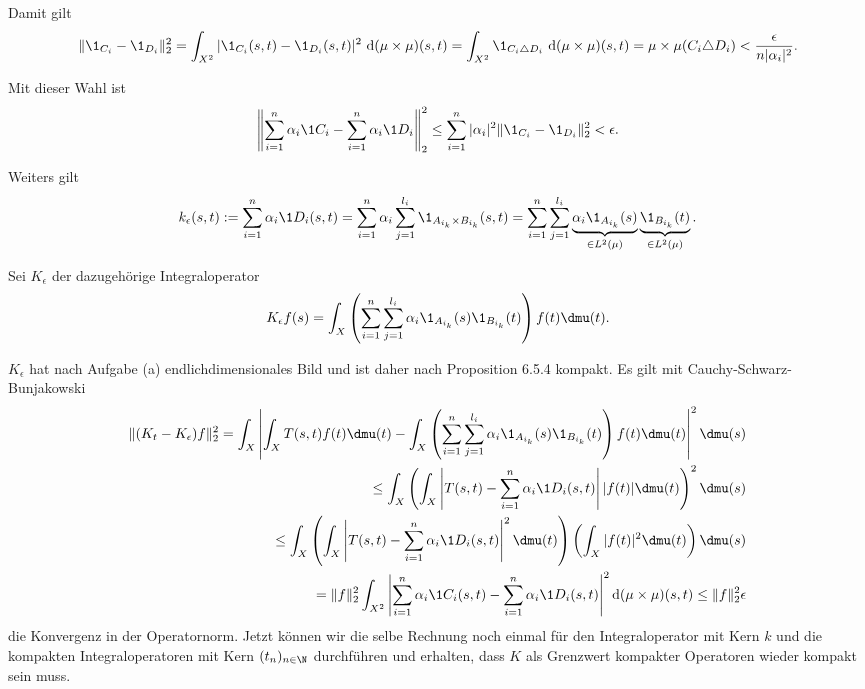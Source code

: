 \begin{solution}
\begin{enumerate}[label = (\alph*)]
Damit gilt
\begin{align*}
    \|\1_{C_i} - \1_{D_i}\|_2^2 = \int_{X^2} |\1_{C_i}(s,t) - \1_{D_i}(s,t)|^2
     ~\mathrm{d}(\mu\times\mu)(s,t) = \int_{X^2} \1_{C_i \triangle D_i}~\mathrm{d}(\mu\times\mu)(s,t) =
     \mu\times\mu(C_i \triangle D_i) < \/
     \frac{\epsilon}{n|\alpha_i|^2}.
\end{align*}


Mit dieser Wahl ist
\begin{align*}
    \left\| \sum_{i = 1}^n \alpha_i \1C_i -
    \sum_{i = 1}^n \alpha_i \1D_i\right\|_2^2
    \leq \sum_{i=1}^{n} |\alpha_{i}|^2 \|\1_{C_{i}} - \1_{D_{i}} \|_2^2 < \epsilon.
\end{align*}

Weiters gilt
\begin{align*}
    k_{\epsilon}(s,t) := \sum_{i = 1}^n \alpha_i \1D_i(s,t)
    = \sum_{i=1}^{n} \alpha_{i} \sum_{j=1}^{l_{i}}  \1_{A_{i_k} \times B_{i_k}}(s,t)
    = \sum_{i=1}^{n} \sum_{j=1}^{l_{i}}   \underbrace{\alpha_{i} \1_{A_{i_k}}(s)}_{\in L^2(\mu)}
     \underbrace{\1_{B_{i_k}}(t)}_{\in L^2(\mu)}.
\end{align*}

Sei $K_{\epsilon}$ der dazugehörige Integraloperator
\begin{align*}
  K_{\epsilon} f(s) = \int_X \left(\sum_{i=1}^{n} \sum_{j=1}^{l_{i}}   \alpha_{i} \1_{A_{i_k}}(s) \1_{B_{i_k}}(t)\right) f(t) \dmu(t).
\end{align*}

$K_{\epsilon}$ hat nach Aufgabe (a) endlichdimensionales Bild und ist daher nach Proposition 6.5.4 kompakt. Es gilt mit Cauchy-Schwarz-Bunjakowski
\begin{align*}
    \|(K_t-K_{\epsilon}) f\|_2^2 = \int_X \left| \int_X T(s,t) f(t) \dmu(t) - \int_X \left(\sum_{i=1}^{n} \sum_{j=1}^{l_{i}}   \alpha_{i} \1_{A_{i_k}}(s) \1_{B_{i_k}}(t)\right) f(t) \dmu(t) \right|^2 \dmu(s) \\
    \leq \int_X \left( \int_X \left|T(s,t) - \sum_{i = 1}^n \alpha_i \1D_i(s,t)\right| |f(t)| \dmu(t)\right)^2 \dmu(s) \\
    \leq \int_X \left(\int_X \left|T(s,t) - \sum_{i = 1}^n \alpha_i \1D_i(s,t)\right|^2 \dmu(t)\right) \left(\int_X |f(t)|^2 \dmu(t)\right) \dmu(s) \\
    = \|f\|_2^2\int_{X^2} \left| \sum_{i = 1}^n \alpha_i \1C_i(s,t) -
    \sum_{i = 1}^n \alpha_i \1D_i(s,t)\right|^2 \mathrm{d}(\mu\times\mu)(s,t) \leq \|f\|_2^2\epsilon
\end{align*}
die Konvergenz in der Operatornorm.
Jetzt können wir die selbe Rechnung noch einmal für den Integraloperator mit Kern $k$
und die kompakten Integraloperatoren mit Kern $(t_n)_{n \in \N}$ durchführen und
erhalten, dass $K$ als Grenzwert kompakter Operatoren wieder kompakt sein muss.

\end{enumerate}

\end{solution}
